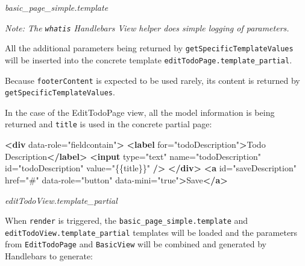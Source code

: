\documentclass[9pt]{book}
\newenvironment{Shaded}{}{}
\newcommand{\KeywordTok}[1]{\textcolor[rgb]{0.00,0.44,0.13}{\textbf{{#1}}}}
\newcommand{\StringTok}[1]{\textcolor[rgb]{0.25,0.44,0.63}{{#1}}}
\newcommand{\OtherTok}[1]{\textcolor[rgb]{0.00,0.44,0.13}{{#1}}}
\newcommand{\NormalTok}[1]{{#1}}
\begin{document}
\emph{basic\_page\_simple.template}

\emph{Note: The \texttt{whatis} Handlebars View helper does simple
logging of parameters.}

All the additional parameters being returned by
\texttt{getSpecificTemplateValues} will be inserted into the concrete
template \texttt{editTodoPage.template\_partial}.

Because \texttt{footerContent} is expected to be used rarely, its
content is returned by \texttt{getSpecificTemplateValues}.

In the case of the EditTodoPage view, all the model information is being
returned and \texttt{title} is used in the concrete partial page:

\begin{Shaded}
\begin{Highlighting}[]
\KeywordTok{<div}\OtherTok{ data-role=}\StringTok{"fieldcontain"}\KeywordTok{>}
    \KeywordTok{<label}\OtherTok{ for=}\StringTok{"todoDescription"}\KeywordTok{>}\NormalTok{Todo Description}\KeywordTok{</label>}
    \KeywordTok{<input}\OtherTok{ type=}\StringTok{"text"}\OtherTok{ name=}\StringTok{"todoDescription"}\OtherTok{ id=}\StringTok{"todoDescription"}\OtherTok{ value=}\StringTok{"\{\{title\}\}"} \KeywordTok{/>}
\KeywordTok{</div>}
    \KeywordTok{<a}\OtherTok{ id=}\StringTok{"saveDescription"}\OtherTok{ href=}\StringTok{"#"}\OtherTok{ data-role=}\StringTok{"button"}\OtherTok{ data-mini=}\StringTok{"true"}\KeywordTok{>}\NormalTok{Save}\KeywordTok{</a>}
\end{Highlighting}
\end{Shaded}

\emph{editTodoView.template\_partial}

When \texttt{render} is triggered, the
\texttt{basic\_page\_simple.template} and
\texttt{editTodoView.template\_partial} templates will be loaded and the
parameters from \texttt{EditTodoPage} and \texttt{BasicView} will be
combined and generated by Handlebars to generate:
\end{document}
